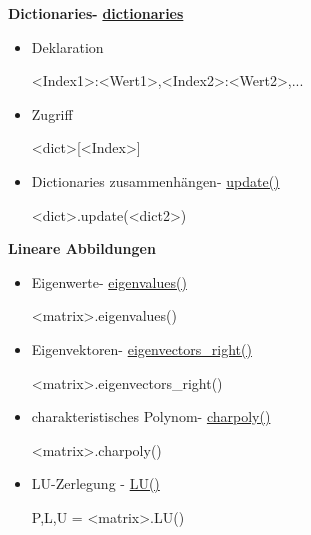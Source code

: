 \documentclass[a4paper,9pt,DIV15,twocolumn]{scrartcl}
\begin{document}
\textbf{Dictionaries- } \href{http://docs.python.org/library/stdtypes.html?highlight=.update#mapping-types-dict}{\textbf{dictionaries}}
\begin{itemize}
 \item Deklaration
\begin{sagein}
{<Index1>:<Wert1>,<Index2>:<Wert2>,...}
\end{sagein}
 \item Zugriff
\begin{sagein}
 <dict>[<Index>]
\end{sagein}
\item Dictionaries zusammenhängen- \href{http://docs.python.org/library/stdtypes.html?highlight=.update#dict.update}{update()}
\begin{sagein}
 <dict>.update(<dict2>)
\end{sagein}
\end{itemize}
\bigskip
\bigskip
\bigskip
\bigskip
\textbf{Lineare Abbildungen}
\begin{itemize}
\item Eigenwerte- \href{https://sage.math.uni-goettingen.de/doc/static/reference/sage/matrix/matrix2.html?highlight=eigenvalues#sage.matrix.matrix2.Matrix.eigenvalues}{eigenvalues()}
\begin{sagein}
<matrix>.eigenvalues()
\end{sagein}
 \item Eigenvektoren- \href{https://sage.math.uni-goettingen.de/doc/static/reference/sage/matrix/matrix2.html?highlight=eigenvalues#sage.matrix.matrix2.Matrix.eigenvectors_right}{eigenvectors\_right()}
\begin{sagein}
<matrix>.eigenvectors_right()
\end{sagein}
\item charakteristisches Polynom- \href{https://sage.math.uni-goettingen.de/doc/static/reference/sage/matrix/matrix2.html?highlight=charpoly#sage.matrix.matrix2.Matrix.charpoly}{charpoly()}
\begin{sagein}
<matrix>.charpoly() 
\end{sagein}
\item LU-Zerlegung - \href{https://sage.math.uni-goettingen.de/doc/static/reference/sage/matrix/matrix2.html?highlight=matrix.lu#sage.matrix.matrix2.Matrix.LU}{LU()}
    \begin{sagein}
P,L,U = <matrix>.LU()
    \end{sagein}
\end{itemize}
\end{document}
